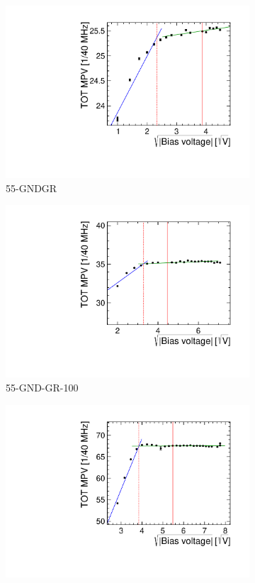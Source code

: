 \begin{figure}[htbp]
  \begin{subfigure}[b]{0.33\textwidth}
    \includegraphics[width=\textwidth]{./figures/TestBeam/depletionVoltage_W0019_C07.pdf}
    \caption{55-GNDGR}
  \end{subfigure} \hfill
  \begin{subfigure}[b]{0.33\textwidth}
    \includegraphics[width=\textwidth]{./figures/TestBeam/depletionVoltage_W0005_E02.pdf}
    \caption{55-GND-GR-100}
  \end{subfigure}\hfill
  \begin{subfigure}[b]{0.33\textwidth}
    \includegraphics[width=\textwidth]{./figures/TestBeam/depletionVoltage_W0005_F01.pdf}

\end{subfigure}
\end{figure}
